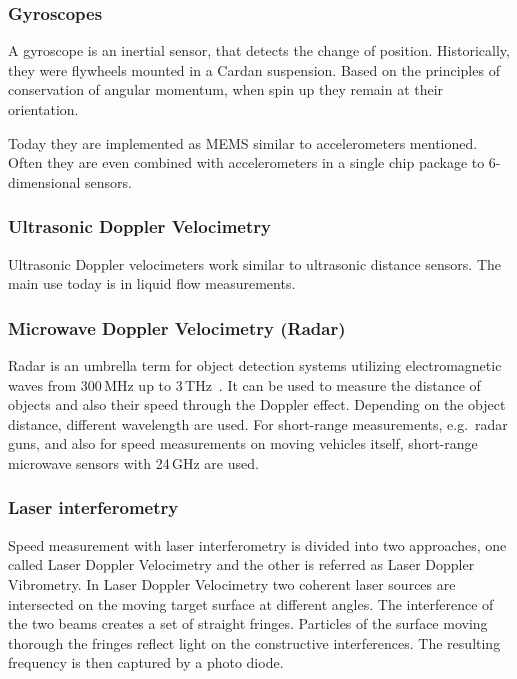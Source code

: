 \documentclass[12pt,a4paper]{article}
\begin{document}
\subsubsection{Gyroscopes}

A gyroscope is an inertial sensor, that detects the change of position.
Historically, they were flywheels mounted in a Cardan suspension. 
Based on the principles of conservation of angular momentum, when spin up they remain at their orientation.

Today they are implemented as MEMS similar to accelerometers mentioned.
Often they are even combined with accelerometers in a single chip package to 6-dimensional sensors.


\subsubsection{Ultrasonic Doppler Velocimetry}

Ultrasonic Doppler velocimeters  work similar to ultrasonic distance sensors.
The main use today is in liquid flow  measurements.


\subsubsection{Microwave Doppler Velocimetry (Radar)}

Radar is an umbrella term for object detection systems utilizing electromagnetic waves from 300\,MHz up to 3\,THz~\cite{nrt}.
It can be used to measure the distance of objects and also their speed through the Doppler effect.
Depending on the object distance, different wavelength are used.
For short-range measurements, e.g.\ radar guns, and also for speed measurements on moving vehicles itself, short-range microwave sensors with 24\,GHz are used.~\cite{s_r_radar}

\subsubsection{Laser interferometry}

Speed measurement with laser interferometry is divided into two approaches, one called Laser Doppler Velocimetry and the other is referred as Laser Doppler Vibrometry.
In Laser Doppler Velocimetry two coherent laser sources are intersected on the moving target surface at different angles.
The interference of the two beams creates a set of straight fringes. 
Particles of the surface moving thorough the fringes reflect light on the constructive interferences.
The resulting frequency is then captured by a photo diode.
\end{document}
